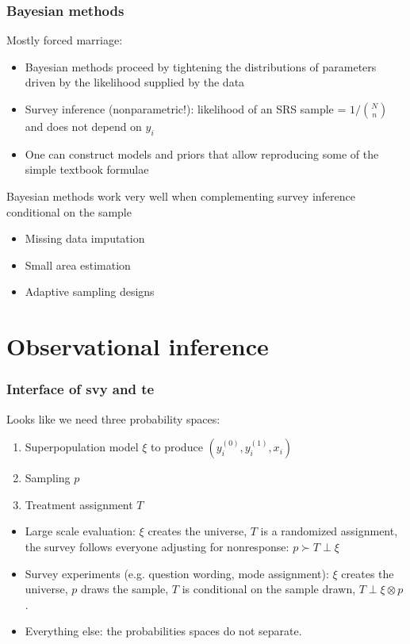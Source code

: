 \documentclass{beamer}
\begin{document}
\begin{frame}\frametitle{Bayesian methods}

Mostly forced marriage:
\begin{itemize}
    \item Bayesian methods proceed by tightening the distributions of parameters
        driven by the likelihood supplied by the data
    \item Survey inference (nonparametric!): likelihood of an SRS sample = $1/{N \choose n}$ and does not depend on $y_i$
    \item One can construct models and priors that allow reproducing some of the simple
        textbook formulae \citep{little:2012}
\end{itemize}

Bayesian methods work very well when complementing survey inference conditional on the sample
\begin{itemize}
    \item Missing data imputation
    \item Small area estimation
    \item Adaptive sampling designs
\end{itemize}

\end{frame}




\section{Observational inference}

\begin{frame}\frametitle{Interface of svy and te}

Looks like we need three probability spaces:
\begin{enumerate}
	\item Superpopulation model $\xi$ to produce $(y^{(0)}_i, y^{(1)}_i, x_i)$
	\item Sampling $p$
	\item Treatment assignment $T$
\end{enumerate}


\begin{itemize}
   \item Large scale evaluation: $\xi$ creates the universe, $T$ is a randomized assignment,
           the survey follows everyone adjusting for nonresponse: $p \succ T \perp \xi$
   \item Survey experiments (e.g. question wording, mode assignment): $\xi$ creates the universe,
           $p$ draws the sample, $T$ is conditional on the sample drawn, $T \perp \xi \otimes p$. 
   \item Everything else: the probabilities spaces do not separate.
\end{itemize}

\end{frame}
\end{document}
